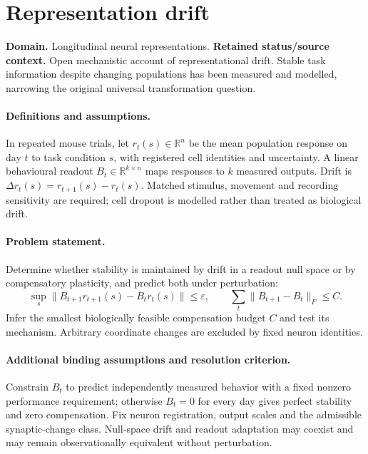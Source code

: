 \documentclass[11pt]{article}
\begin{document}
\section*{Representation drift}
\label{prob:107}
\label{rank:139}
\par\smallskip

\noindent\textbf{Domain.} Longitudinal neural representations. \quad \textbf{Retained status/source context.} Open mechanistic account of representational drift. Stable task information despite changing populations has been measured and modelled, narrowing the original universal transformation question.
\paragraph{Definitions and assumptions.} In repeated mouse trials, let $r_t(s)\in\mathbb{R}^n$ be the mean population response on day $t$ to task condition $s$, with registered cell identities and uncertainty. A linear behavioural readout $B_t\in\mathbb{R}^{k\times n}$ maps responses to $k$ measured outputs. Drift is $\Delta r_t(s)=r_{t+1}(s)-r_t(s)$. Matched stimulus, movement and recording sensitivity are required; cell dropout is modelled rather than treated as biological drift.
\paragraph{Problem statement.} Determine whether stability is maintained by drift in a readout null space or by compensatory plasticity, and predict both under perturbation:
\[
\sup_s\|B_{t+1}r_{t+1}(s)-B_tr_t(s)\|\leq\varepsilon,
\qquad
\sum_t\|B_{t+1}-B_t\|_F\leq C.
\]
Infer the smallest biologically feasible compensation budget $C$ and test its mechanism. Arbitrary coordinate changes are excluded by fixed neuron identities.
\paragraph{Additional binding assumptions and resolution criterion.} Constrain $B_t$ to predict independently measured behavior with a fixed nonzero performance requirement; otherwise $B_t=0$ for every day gives perfect stability and zero compensation. Fix neuron registration, output scales and the admissible synaptic-change class. Null-space drift and readout adaptation may coexist and may remain observationally equivalent without perturbation.
\end{document}
